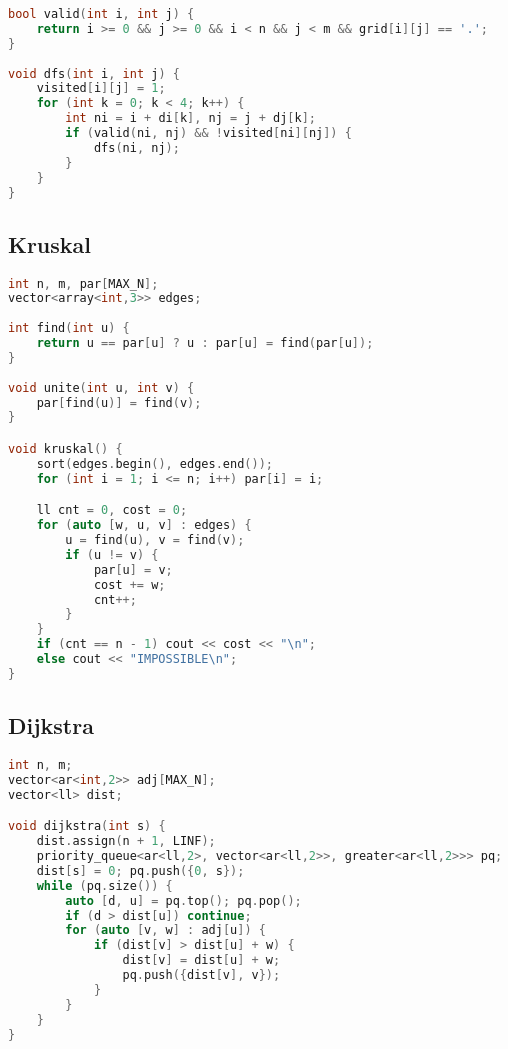 \documentclass{article}
\begin{document}
\begin{multicols}{2}
\begin{lstlisting}[linewidth=\columnwidth,breaklines=true,language=C++]
bool valid(int i, int j) {
    return i >= 0 && j >= 0 && i < n && j < m && grid[i][j] == '.';
}
 
void dfs(int i, int j) {
    visited[i][j] = 1;
    for (int k = 0; k < 4; k++) {
        int ni = i + di[k], nj = j + dj[k];
        if (valid(ni, nj) && !visited[ni][nj]) {
            dfs(ni, nj);
        }
    }
}
\end{lstlisting}
\subsection{Kruskal}
\lstset {    language=C++,
    basicstyle=\small\ttfamily,
    numbers=left,
    breaklines=true,
    tabsize=4}
\begin{lstlisting}[linewidth=\columnwidth,breaklines=true,language=C++]
int n, m, par[MAX_N];
vector<array<int,3>> edges;
 
int find(int u) {
    return u == par[u] ? u : par[u] = find(par[u]);
}
 
void unite(int u, int v) {
    par[find(u)] = find(v);
}

void kruskal() {
    sort(edges.begin(), edges.end());
    for (int i = 1; i <= n; i++) par[i] = i;

    ll cnt = 0, cost = 0;
    for (auto [w, u, v] : edges) {
        u = find(u), v = find(v);
        if (u != v) {
            par[u] = v;
            cost += w;
            cnt++;
        }
    }
    if (cnt == n - 1) cout << cost << "\n";
    else cout << "IMPOSSIBLE\n";
}

\end{lstlisting}
\subsection{Dijkstra}
\lstset {    language=C++,
    basicstyle=\small\ttfamily,
    numbers=left,
    breaklines=true,
    tabsize=4}
\begin{lstlisting}[linewidth=\columnwidth,breaklines=true,language=C++]
int n, m;
vector<ar<int,2>> adj[MAX_N];
vector<ll> dist;

void dijkstra(int s) {
    dist.assign(n + 1, LINF);
    priority_queue<ar<ll,2>, vector<ar<ll,2>>, greater<ar<ll,2>>> pq;
    dist[s] = 0; pq.push({0, s});
    while (pq.size()) {
        auto [d, u] = pq.top(); pq.pop();
        if (d > dist[u]) continue;
        for (auto [v, w] : adj[u]) {
            if (dist[v] > dist[u] + w) {
                dist[v] = dist[u] + w;
                pq.push({dist[v], v});
            }
        }
    } 
}


\end{lstlisting}
\end{multicols}
\end{document}
